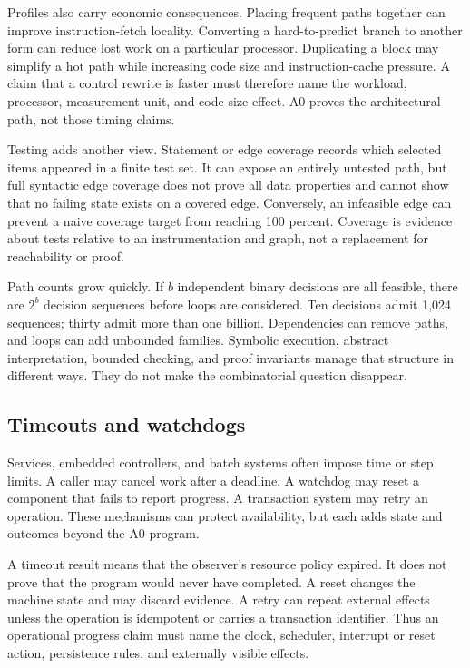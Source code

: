 Profiles also carry economic consequences. Placing frequent paths together
can improve instruction-fetch locality. Converting a hard-to-predict branch
to another form can reduce lost work on a particular processor. Duplicating a
block may simplify a hot path while increasing code size and instruction-cache
pressure. A claim that a control rewrite is faster must therefore name the
workload, processor, measurement unit, and code-size effect. A0 proves the
architectural path, not those timing claims.

Testing adds another view. Statement or edge coverage records which selected
items appeared in a finite test set. It can expose an entirely untested path,
but full syntactic edge coverage does not prove all data properties and cannot
show that no failing state exists on a covered edge. Conversely, an infeasible
edge can prevent a naive coverage target from reaching 100 percent. Coverage
is evidence about tests relative to an instrumentation and graph, not a
replacement for reachability or proof.

Path counts grow quickly. If \(b\) independent binary decisions are all
feasible, there are \(2^b\) decision sequences before loops are considered.
Ten decisions admit 1,024 sequences; thirty admit more than one billion.
Dependencies can remove paths, and loops can add unbounded families. Symbolic
execution, abstract interpretation, bounded checking, and proof invariants
manage that structure in different ways. They do not make the combinatorial
question disappear.

\subsection{Timeouts and watchdogs}

Services, embedded controllers, and batch systems often impose time or step
limits. A caller may cancel work after a deadline. A watchdog may reset a
component that fails to report progress. A transaction system may retry an
operation. These mechanisms can protect availability, but each adds state and
outcomes beyond the A0 program.

A timeout result means that the observer's resource policy expired. It does
not prove that the program would never have completed. A reset changes the
machine state and may discard evidence. A retry can repeat external effects
unless the operation is idempotent or carries a transaction identifier. Thus
an operational progress claim must name the clock, scheduler, interrupt or
reset action, persistence rules, and externally visible effects.

